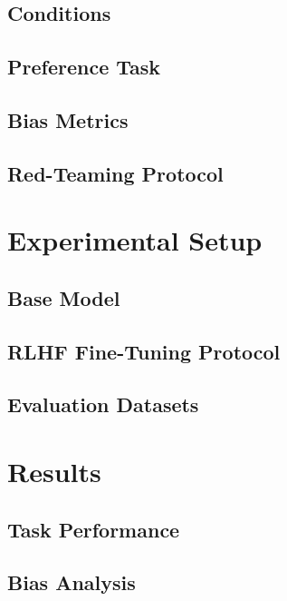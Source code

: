 \documentclass{article}
\begin{document}
\subsection{Conditions}

\subsection{Preference Task}

\subsection{Bias Metrics}

\subsection{Red-Teaming Protocol}

\section{Experimental Setup}
\subsection{Base Model}
\subsection{RLHF Fine-Tuning Protocol}
\subsection{Evaluation Datasets}

\section{Results}

\subsection{Task Performance}
\subsection{Bias Analysis}
\end{document}
